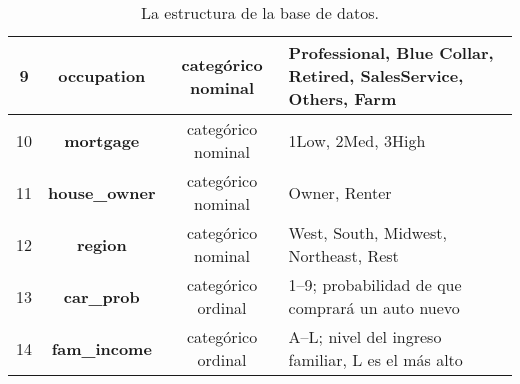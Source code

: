 \documentclass[letterpaper,11pt]{article}
\begin{document}
\begin{table}
\begin{center}
{\begin{tabular}{|c|c|c|p{8cm}|}
    \hline 
    9 &\bf\small occupation & categórico nominal & Professional, Blue Collar, Retired, SalesService,
       Others, Farm\\
    \hline 
    10 &\bf\small  mortgage & categórico nominal & 1Low, 2Med,  3High\\
    \hline 
    11 &\bf\small house\_owner & categórico nominal & Owner, Renter \\
    \hline 
    12 &\bf\small region & categórico nominal & West, South, Midwest, Northeast, Rest\\
    \hline 
    13 &\bf\small car\_prob & categórico ordinal & 1--9; probabilidad de que comprará un auto nuevo\\
    \hline 
    14 &\bf\small fam\_income & categórico ordinal & A--L; nivel del ingreso familiar, L es el más alto\\
    \hline
\end{tabular}}
\end{center}
\caption{\small La estructura de la base de datos.}
\label{tab:1}
\end{table}
\end{document}
